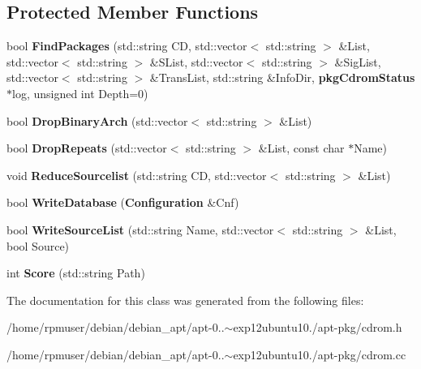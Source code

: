 \subsection*{\-Protected \-Member \-Functions}
\begin{DoxyCompactItemize}
\item 
bool {\bfseries \-Find\-Packages} (std\-::string \-C\-D, std\-::vector$<$ std\-::string $>$ \&\-List, std\-::vector$<$ std\-::string $>$ \&\-S\-List, std\-::vector$<$ std\-::string $>$ \&\-Sig\-List, std\-::vector$<$ std\-::string $>$ \&\-Trans\-List, std\-::string \&\-Info\-Dir, {\bf pkg\-Cdrom\-Status} $\ast$log, unsigned int \-Depth=0)\label{classpkgCdrom_a5b069d4382ad208094fbd8aaec83d4e5}

\item 
bool {\bfseries \-Drop\-Binary\-Arch} (std\-::vector$<$ std\-::string $>$ \&\-List)\label{classpkgCdrom_ac6f8c03ba87340ad0c31e1fea9c02398}

\item 
bool {\bfseries \-Drop\-Repeats} (std\-::vector$<$ std\-::string $>$ \&\-List, const char $\ast$\-Name)\label{classpkgCdrom_a7913f2b115eb86bad73ac60c4b35996b}

\item 
void {\bfseries \-Reduce\-Sourcelist} (std\-::string \-C\-D, std\-::vector$<$ std\-::string $>$ \&\-List)\label{classpkgCdrom_aa72ade02e02fa276f8d13ed1251a2b85}

\item 
bool {\bfseries \-Write\-Database} ({\bf \-Configuration} \&\-Cnf)\label{classpkgCdrom_a61612e5b5e2d2b87351bfcc94d7be29e}

\item 
bool {\bfseries \-Write\-Source\-List} (std\-::string \-Name, std\-::vector$<$ std\-::string $>$ \&\-List, bool \-Source)\label{classpkgCdrom_ab996d15296b7a3721927f7badba3f9b0}

\item 
int {\bfseries \-Score} (std\-::string \-Path)\label{classpkgCdrom_aeba517198639eed5c048d568240d2c46}

\end{DoxyCompactItemize}


\-The documentation for this class was generated from the following files\-:\begin{DoxyCompactItemize}
\item 
/home/rpmuser/debian/debian\-\_\-apt/apt-\/0..$\sim$exp12ubuntu10./apt-\/pkg/cdrom.\-h\item 
/home/rpmuser/debian/debian\-\_\-apt/apt-\/0..$\sim$exp12ubuntu10./apt-\/pkg/cdrom.\-cc\end{DoxyCompactItemize}
